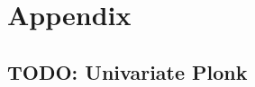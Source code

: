 \documentclass[11pt]{article}
\theoremstyle{definition}
\theoremstyle{remark}
\begin{document}



\appendix
\section{Appendix}
\label{s:Appendix}

\subsection{TODO: Univariate Plonk}



\end{document}

